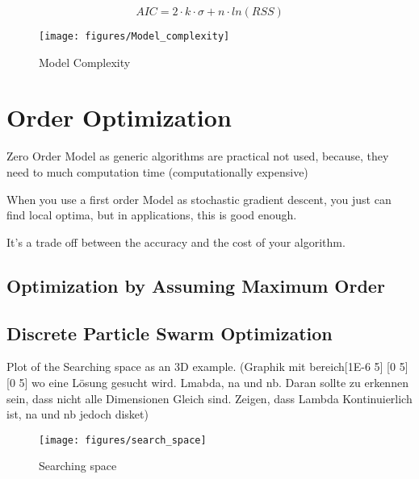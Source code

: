  \begin{equation}
	AIC = 2 \cdot k \cdot \sigma + n \cdot ln(RSS)
	\label{eq:aic_rms_adapt}
\end{equation}

\begin{figure}[!htb]
    \centering
    \texttt{[image: figures/Model\_complexity]} %
    \caption[2D Example Least Square vs. Gruop LASSO]{Model Complexity}
    \label{fig:model_complexity}
\end{figure}




\section{Order Optimization}
\label{sec:order_opt}

Zero Order Model as generic algorithms are practical not used, because, they need to much computation time (computationally expensive)

When you use a first order Model as stochastic gradient descent, you just can find local optima, but in applications, this is good enough.

It's a trade off between the accuracy and the cost of your algorithm.

\subsection{Optimization by Assuming Maximum Order}
\label{sec:optimization_may_order}



\subsection{Discrete Particle Swarm Optimization}
\label{sec:optimization}

Plot of the Searching space as an 3D example. (Graphik mit bereich[1E-6 5] [0 5] [0 5] wo eine Lösung gesucht wird. Lmabda, na und nb. Daran sollte zu erkennen sein, dass nicht alle Dimensionen Gleich sind. Zeigen, dass Lambda Kontinuierlich ist, na und nb jedoch disket)

\begin{figure}[!htb]
    \centering
    \texttt{[image: figures/search\_space]} %
    \caption[Scheme of particle swarm optimization]{Searching space}
    \label{fig:flowchart}
\end{figure}


